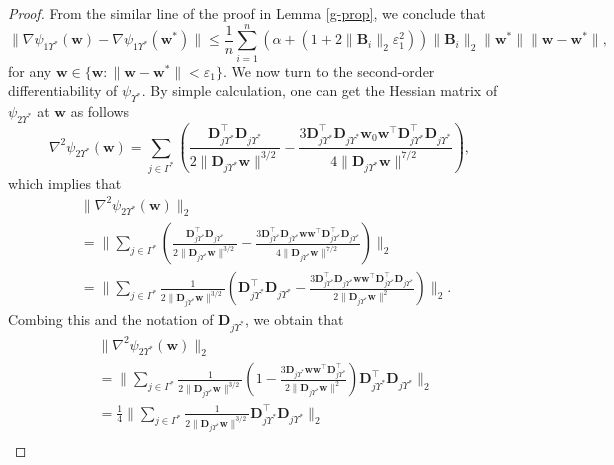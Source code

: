\documentclass{article}
\numberwithin{equation}{section}
\begin{document}
\begin{proof}
From the similar line of the proof in Lemma \ref{g-prop}, we conclude that
\begin{equation}\label{Lpsi1}\|\nabla\psi_{1\Upsilon^*}(\mathbf{w})-\nabla\psi_{1\Upsilon^*}(\mathbf{w}^*)\|\leq
	\frac{1}{n}\sum_{i=1}^n(\alpha+(1+2\|\mathbf{B}_i\|_2\varepsilon_1^2))\|\mathbf{B}_i\|_2\|\mathbf{w}^*\|\|\mathbf{w}-\mathbf{w}^*\|,\end{equation}
for any $\mathbf{w}\in\{\mathbf{w}: \|\mathbf{w}-\mathbf{w}^*\|<\varepsilon_1\}.$
We now turn to the second-order differentiability of $\psi_{\Upsilon^*}$. By simple calculation, one can get   the Hessian matrix of $\psi_{2\Upsilon^*}$ at $\mathbf{w}$ as follows
$$\nabla^2\psi_{2\Upsilon^*}(\mathbf{w})=
\sum_{j\in\Gamma^*}(\frac{\mathbf{D}_{j\Upsilon^*}^\top\mathbf{D}_{j\Upsilon^*}}{2\|\mathbf{D}_{j\Upsilon^*}\mathbf{w}\|^{3/2}}-
\frac{3\mathbf{D}_{j\Upsilon^*}^\top\mathbf{D}_{j\Upsilon^*}\mathbf{w}_0\mathbf{w}^\top\mathbf{D}_{j\Upsilon^*}^\top
	\mathbf{D}_{j\Upsilon^*}}{4\|\mathbf{D}_{j\Upsilon^*}\mathbf{w}\|^{7/2}}),$$
which implies that
$$\begin{aligned}
	&\|\nabla^2\psi_{2\Upsilon^*}(\mathbf{w})\|_2\\
	&=\|\sum_{j\in\Gamma^*}(\frac{\mathbf{D}_{j\Upsilon^*}^\top\mathbf{D}_{j\Upsilon^*}}{2\|\mathbf{D}_{j\Upsilon^*}\mathbf{w}\|^{3/2}}-
	\frac{3\mathbf{D}_{j\Upsilon^*}^\top\mathbf{D}_{j\Upsilon^*}\mathbf{w}\mathbf{w}^\top\mathbf{D}_{j\Upsilon^*}^\top
		\mathbf{D}_{j\Upsilon^*}}{4\|\mathbf{D}_{j\Upsilon^*}\mathbf{w}\|^{7/2}})\|_2\\
	&=\|\sum_{j\in\Gamma^*}\frac{1}{2\|\mathbf{D}_{j\Upsilon^*}\mathbf{w}\|^{3/2}}
	(\mathbf{D}_{j\Upsilon^*}^\top\mathbf{D}_{j\Upsilon^*}-
	\frac{3\mathbf{D}_{j\Upsilon^*}^\top\mathbf{D}_{j\Upsilon^*}\mathbf{w}\mathbf{w}^\top\mathbf{D}_{j\Upsilon^*}^\top
		\mathbf{D}_{j\Upsilon^*}}{2\|\mathbf{D}_{j\Upsilon^*}\mathbf{w}\|^2})\|_2.\end{aligned}$$
Combing this and the notation of $\mathbf{D}_{j\Upsilon^*}$, we obtain that
$$\begin{aligned}
	&\|\nabla^2\psi_{2\Upsilon^*}(\mathbf{w})\|_2\\
	&=\|\sum_{j\in\Gamma^*}\frac{1}{2\|\mathbf{D}_{j\Upsilon^*}\mathbf{w}\|^{3/2}}(1-
	\frac{3\mathbf{D}_{j\Upsilon^*}\mathbf{w}\mathbf{w}^\top\mathbf{D}_{j\Upsilon^*}^\top}{2\|\mathbf{D}_{j\Upsilon^*}\mathbf{w}\|^2})\mathbf{D}_{j\Upsilon^*}^\top\mathbf{D}_{j\Upsilon^*}\|_2\\
	&=
	\frac{1}{4}\|\sum_{j\in\Gamma^*}\frac{1}{2\|\mathbf{D}_{j\Upsilon^*}\mathbf{w}\|^{3/2}}
	\mathbf{D}_{j\Upsilon^*}^\top\mathbf{D}_{j\Upsilon^*}\|_2\\

\end{aligned}$$
\end{proof}
\end{document}
